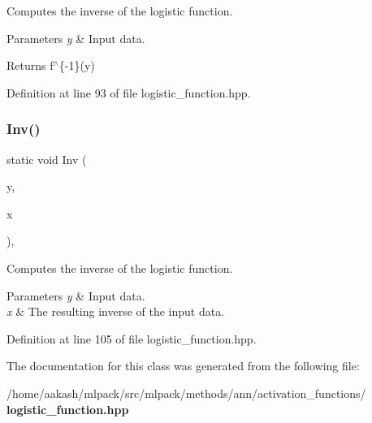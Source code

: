 Computes the inverse of the logistic function. 


\begin{DoxyParams}{Parameters}
{\em y} & Input data. \\
\hline
\end{DoxyParams}
\begin{DoxyReturn}{Returns}
f$^\wedge$\{-\/1\}(y) 
\end{DoxyReturn}


Definition at line 93 of file logistic\+\_\+function.\+hpp.

\mbox{\label{classmlpack_1_1ann_1_1LogisticFunction_ad48548410161bbf6178eb1c293c991c3}} 
\subsubsection{Inv()\hspace{0.1cm}{\footnotesize\ttfamily [2/2]}}
{\footnotesize\ttfamily static void Inv (\begin{DoxyParamCaption}\item[{const Input\+Vec\+Type \&}]{y,  }\item[{Output\+Vec\+Type \&}]{x }\end{DoxyParamCaption})\hspace{0.3cm}{\ttfamily [inline]}, {\ttfamily [static]}}



Computes the inverse of the logistic function. 


\begin{DoxyParams}{Parameters}
{\em y} & Input data. \\
\hline
{\em x} & The resulting inverse of the input data. \\
\hline
\end{DoxyParams}


Definition at line 105 of file logistic\+\_\+function.\+hpp.



The documentation for this class was generated from the following file\+:\begin{DoxyCompactItemize}
\item 
/home/aakash/mlpack/src/mlpack/methods/ann/activation\+\_\+functions/\textbf{ logistic\+\_\+function.\+hpp}\end{DoxyCompactItemize}
